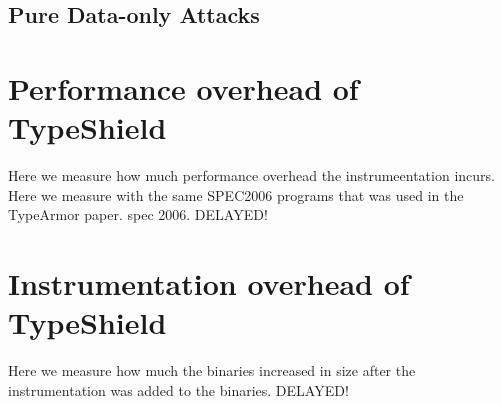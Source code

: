 \subsection{Pure Data-only Attacks}
\label{Pure Data-only Attacks}


\section{Performance overhead of TypeShield}
\label{section:typeshieldoverheadperformance}
Here we measure how much performance overhead the instrumeentation incurs.
Here we measure with the same SPEC2006 programs that was used in the TypeArmor paper.
spec 2006.
DELAYED!


\section{Instrumentation overhead of TypeShield}
\label{section:typeshieldoverheadinstrumentation}
Here we measure how much the binaries increased in size after the instrumentation was added to the binaries.
DELAYED!

